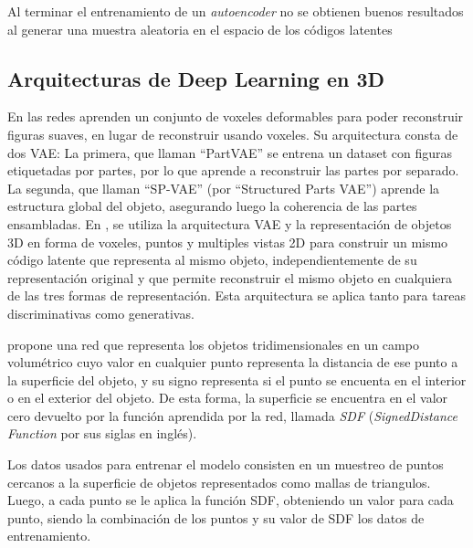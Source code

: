 \documentclass[spanish]{article}
\begin{document}
Al terminar el entrenamiento de un \textit{autoencoder} no se obtienen
buenos resultados al generar una muestra aleatoria en el espacio de
los códigos latentes


\subsection{Arquitecturas de Deep Learning en 3D}

En \cite{Gao2019} las redes aprenden un conjunto de voxeles deformables
para poder reconstruir figuras suaves, en lugar de reconstruir usando
voxeles. Su arquitectura consta de dos VAE: La primera, que llaman
``PartVAE'' se entrena un dataset con figuras etiquetadas por partes,
por lo que aprende a reconstruir las partes por separado. La segunda,
que llaman ``SP-VAE'' (por ``Structured Parts VAE'') aprende la
estructura global del objeto, asegurando luego la coherencia de las
partes ensambladas. En \cite{Muralikrishnan2019}, se utiliza la
arquitectura VAE y la representación de objetos 3D en forma de voxeles,
puntos y multiples vistas 2D para construir un mismo código latente
que representa al mismo objeto, independientemente de su
representación original y que permite reconstruir el mismo objeto en
cualquiera de las tres formas de representación. Esta arquitectura se
aplica tanto para tareas discriminativas como generativas.

\cite{Park2019} propone una red que representa los objetos tridimensionales
en un campo volumétrico cuyo valor en cualquier punto representa la 
distancia de ese punto a la superficie del objeto, y su signo representa si
el punto se encuenta en el interior o en el exterior del objeto. De esta
forma, la superficie se encuentra en el valor cero devuelto por la función
aprendida por la red, llamada \textit{SDF} (\textit{SignedDistance
Function} por sus siglas en inglés).

Los datos usados para entrenar el modelo consisten en un muestreo de puntos
cercanos a la superficie de objetos representados como mallas de triangulos.
Luego, a cada punto se le aplica la función SDF, obteniendo un valor para
cada punto, siendo la combinación de los puntos y su valor de SDF los datos
de entrenamiento.
\end{document}
